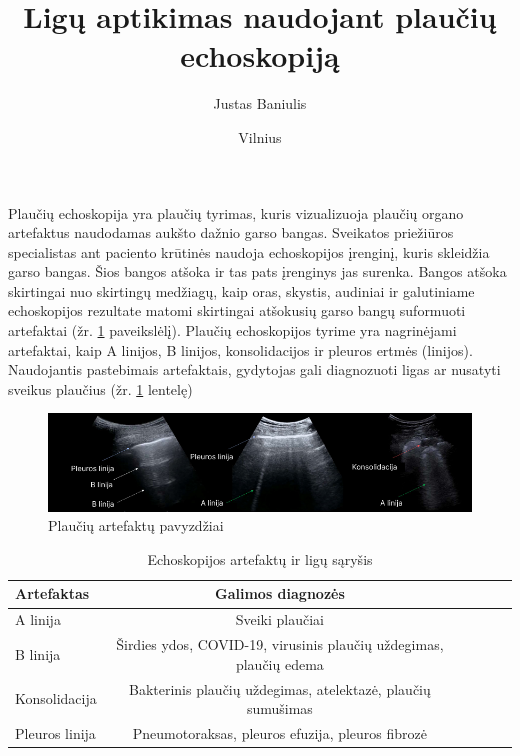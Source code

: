 \documentclass[fleqn]{VUMIFKompMagistrinis}
\institute{Informatikos institutas}  %
\title{Ligų aptikimas naudojant plaučių echoskopiją}
\author{Justas Baniulis}
\date{Vilnius \\ \the\year}
\begin{document}
\maketitle

\tableofcontents


Plaučių echoskopija yra plaučių tyrimas, kuris vizualizuoja plaučių organo artefaktus naudodamas aukšto dažnio garso bangas. Sveikatos priežiūros specialistas ant paciento krūtinės naudoja echoskopijos įrenginį, kuris skleidžia garso bangas. Šios bangos atšoka ir tas pats įrenginys jas surenka. Bangos atšoka skirtingai nuo skirtingų medžiagų, kaip oras, skystis, audiniai ir galutiniame echoskopijos rezultate matomi skirtingai atšokusių garso bangų suformuoti artefaktai (žr. \ref{img:plauciai_art} paveikslėlį). Plaučių echoskopijos tyrime yra nagrinėjami artefaktai, kaip A linijos, B linijos, konsolidacijos ir pleuros ertmės (linijos). Naudojantis pastebimais artefaktais, gydytojas gali diagnozuoti ligas ar nusatyti sveikus plaučius (žr. \ref{tab:ligos} lentelę)
\begin{figure}[H]
    \centering
    \includegraphics[scale=0.5]{img/plauciai_artefaktai.png}
    \caption{Plaučių artefaktų pavyzdžiai \cite{demi2023new}}
    \label{img:plauciai_art}
\end{figure}\begin{table}[H]\footnotesize
  \centering
  \caption{Echoskopijos artefaktų ir ligų sąryšis \cite{demi2023new, cammarota2023lung}}
  \begin{tabular}{|l|c|c|c|c|c|} \hline
     Artefaktas & Galimos diagnozės \\
    \hline
    A linija  & Sveiki plaučiai \\
    B linija & Širdies ydos, COVID-19, virusinis plaučių uždegimas, plaučių edema \\
    Konsolidacija & Bakterinis plaučių uždegimas, atelektazė, plaučių sumušimas \\
    Pleuros linija & Pneumotoraksas, pleuros efuzija, pleuros fibrozė \\
    \hline
  \end{tabular}
  \label{tab:ligos}
\end{table}
\end{document}

